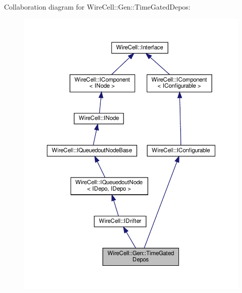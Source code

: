 Collaboration diagram for Wire\+Cell\+:\+:Gen\+:\+:Time\+Gated\+Depos\+:
\nopagebreak
\begin{figure}[H]
\begin{center}
\leavevmode
\includegraphics[width=350pt]{class_wire_cell_1_1_gen_1_1_time_gated_depos__coll__graph}
\end{center}
\end{figure}

